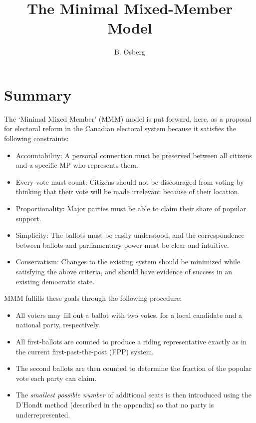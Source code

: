 \documentclass[DIV=calc, paper=a4, fontsize=11pt, twocolumn]{scrartcl}	 %
\title{The Minimal Mixed-Member Model} %
\author{B. Osberg} %
\date{} %
\begin{document}
\thispagestyle{fancy} %

\section*{Summary}
The `Minimal Mixed Member' (MMM) model is put forward, here, as a proposal for electoral reform in the Canadian electoral system because it satisfies the following constraints:

\begin{itemize}
\item Accountability: A personal connection must be preserved between all citizens and a specific MP who represents them.  
\item Every vote must count: Citizens should not be discouraged from voting by thinking that their vote will be made irrelevant because of their location. 
\item Proportionality: Major parties must be able to claim their share of popular support. 
\item  Simplicity: The ballots must be easily understood, and the correspondence between ballots and parliamentary power must be clear and intuitive.
\item  Conservatism: Changes to the existing system should be minimized while satisfying the above criteria, and should have evidence of success in an existing democratic state.
\end{itemize}

MMM fulfills these goals through the following procedure:

\begin{itemize}
\item All voters may fill out a ballot with two votes, for a local candidate and a national party, respectively.
\item All first-ballots are counted to produce a riding representative exactly as in the current first-past-the-post (FPP) system.
\item The second ballots are then counted to determine the fraction of the popular vote each party can claim.
\item The \emph{smallest possible number} of additional seats is then introduced using the D'Hondt method (described in the appendix) so that no party is underrepresented.
\end{itemize}
\end{document}
